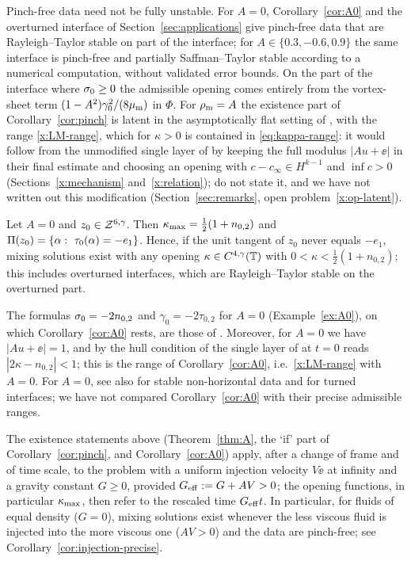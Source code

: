 Pinch-free data need not be fully unstable. For $A=0$, Corollary~\ref{cor:A0} and the overturned interface of Section~\ref{sec:applications} give pinch-free data that are Rayleigh--Taylor stable on part of
the interface; for $A\in\{0.3,-0.6,0.9\}$ the same interface is pinch-free and partially Saffman--Taylor stable according to a numerical computation, without validated error bounds. On the part of the
interface where $\sigma_0\ge0$ the admissible opening comes entirely from the vortex-sheet term $(1-A^2)\gamma_0^2/(8\mu_{\mathrm m})$ in $\Phi$. For $\rho_{\mathrm m}=A$ the existence part of Corollary~\ref{cor:pinch} is
latent in the asymptotically flat setting of \cite{LM26}, with the range \eqref{x:LM-range}, which for $\kappa>0$ is contained in \eqref{eq:kappa-range}: it would follow from the unmodified single layer
of \cite{LM26} by keeping the full modulus $|Au+\ee|$ in their final estimate \cite[Sec.~7.4]{LM26} and choosing an opening with $c-c_\infty\in H^{k-1}$ and $\inf c>0$
(Sections~\ref{x:mechanism} and~\ref{x:relation}); \cite{LM26} do not state it, and we have not written out this modification (Section~\ref{sec:remarks}, open problem~\ref{x:op-latent}).

\begin{corollary}\label{cor:A0}
Let $A=0$ and $z_0\in\mathcal{Z}^{6,\gamma}$. Then $\kappa_{\max}=\frac12(1+n_{0,2})$ and $\Pinch(z_0)=\{\alpha:\ \tau_0(\alpha)=-e_1\}$. Hence, if the unit tangent of $z_0$ never equals $-e_1$, mixing solutions exist with any
opening $\kappa\in C^{4,\gamma}(\mathbb{T})$ with $0<\kappa<\frac12(1+n_{0,2})$; this includes overturned interfaces, which are Rayleigh--Taylor stable on the overturned part.
\end{corollary}

The formulas $\sigma_0=-2n_{0,2}$ and $\gamma_0=-2\tau_{0,2}$ for $A=0$ (Example~\ref{ex:A0}), on which Corollary~\ref{cor:A0} rests, are those of \cite[Secs.~1.2 and~3.1.3]{LM26}. Moreover, for $A=0$ we have
$|Au+\ee|=1$, and by \cite[(4.14) and (7.9)]{LM26} the hull condition of the single layer of \cite{LM26} at $t=0$ reads $|2\kappa-n_{0,2}|<1$; this is the range of Corollary~\ref{cor:A0}, i.e.\
\eqref{x:LM-range} with $A=0$. For $A=0$, see also \cite{FS18} for stable non-horizontal data and \cite{CFM22} for turned interfaces; we have not compared Corollary~\ref{cor:A0} with their precise
admissible ranges.

\begin{corollary}\label{cor:injection}
The existence statements above (Theorem~\ref{thm:A}, the `if' part of Corollary~\ref{cor:pinch}, and Corollary~\ref{cor:A0}) apply, after a change of frame and of time scale, to the problem with a uniform
injection velocity $V\ee$ at infinity and a gravity constant $G\ge0$, provided $G_{\rm eff}:=G+AV>0$; the opening functions, in particular $\kappa_{\max}$, then refer to the rescaled time $G_{\rm eff}t$.
In particular, for fluids of equal density ($G=0$), mixing solutions exist whenever the less viscous fluid is injected into the more viscous one ($AV>0$) and the data are pinch-free; see
Corollary~\ref{cor:injection-precise}.
\end{corollary}

